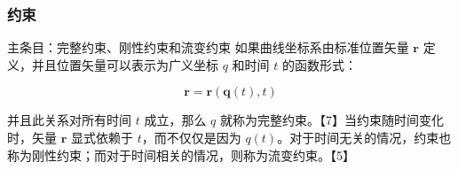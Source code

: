 \subsubsection{约束}  
主条目：完整约束、刚性约束和流变约束  
如果曲线坐标系由标准位置矢量 \( \mathbf{r} \) 定义，并且位置矢量可以表示为广义坐标 \( q \) 和时间 \( t \) 的函数形式：

\[
\mathbf{r} = \mathbf{r} (\mathbf{q} (t), t)
\]

并且此关系对所有时间 \( t \) 成立，那么 \( q \) 就称为完整约束。【7】当约束随时间变化时，矢量 \( \mathbf{r} \) 显式依赖于 \( t \)，而不仅仅是因为 \( q(t) \)。对于时间无关的情况，约束也称为刚性约束；而对于时间相关的情况，则称为流变约束。【5】